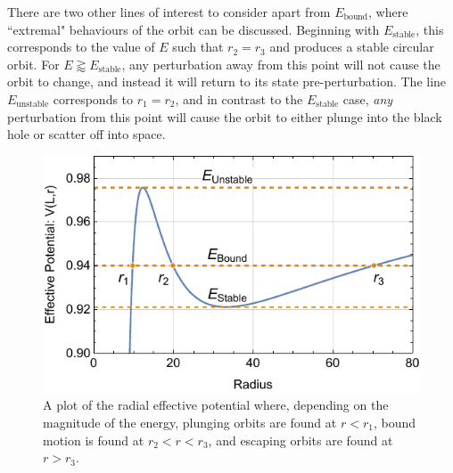 There are two other lines of interest to consider apart from $E_\text{bound}$, where ``extremal" behaviours of the orbit can be discussed.
Beginning with $E_\text{stable}$, this corresponds to the value of $E$ such that $r_2=r_3$ and produces a stable circular orbit.
For $E\gtrapprox E_\text{stable}$, any perturbation away from this point will not cause the orbit to change, and instead it will return to its state pre-perturbation.
The line $E_\text{unstable}$ corresponds to $r_1=r_2$, and in contrast to the $E_\text{stable}$ case, \textit{any} perturbation from this point will cause the orbit to either plunge into the black hole or scatter off into space.

\begin{figure}[!ht]
    \centering
    \includegraphics{images/RadialPotentialPE.pdf}
    \caption[Schwarzschild radial effective potential plot]{A plot of the radial effective potential where, depending on the magnitude of the energy, plunging orbits are found at $r<r_1$, bound motion is found at $r_2<r<r_3$, and escaping orbits are found at $r>r_3$.}
    \label{fig:radEffPot}
\end{figure}


